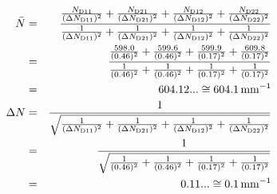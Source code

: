 \documentclass[a4j,10pt]{jarticle}
\begin{document}
\begin{eqnarray*}
    \bar{N}              &=& \frac{ \frac{N_{{\rm D}11}}{(\Delta N_{{\rm D}11})^2} + \frac{N_{{\rm D}21}}{(\Delta N_{{\rm D}21})^2} + \frac{N_{{\rm D}12}}{(\Delta N_{{\rm D}12})^2} + \frac{N_{{\rm D}22}}{(\Delta N_{{\rm D}22})^2}}{ \frac{1}{(\Delta N_{{\rm D}11})^2} + \frac{1}{(\Delta N_{{\rm D}21})^2} + \frac{1}{(\Delta N_{{\rm D}12})^2} + \frac{1}{(\Delta N_{{\rm D}22})^2}} \\
                         &=& \frac{ \frac{598.0}{(0.46)^2} + \frac{599.6}{(0.46)^2} + \frac{599.9}{(0.17)^2} + \frac{609.8}{(0.17)^2}}{ \frac{1}{(0.46)^2} + \frac{1}{(0.46)^2} + \frac{1}{(0.17)^2} + \frac{1}{(0.17)^2}} \\
                         &=& 604.12... \cong 604.1\, {\rm mm}^{-1} \\
    \Delta N             &=& \frac{1}{ \sqrt{ \frac{1}{(\Delta N_{{\rm D}11})^2} + \frac{1}{(\Delta N_{{\rm D}21})^2} + \frac{1}{(\Delta N_{{\rm D}12})^2} + \frac{1}{(\Delta N_{{\rm D}22})^2} } } \\
                         &=& \frac{1}{ \sqrt{ \frac{1}{(0.46)^2} + \frac{1}{(0.46)^2} + \frac{1}{(0.17)^2} + \frac{1}{(0.17)^2} } } \\
                         &=& 0.11... \cong 0.1\, {\rm mm}^{-1} 
\end{eqnarray*}
\end{document}
